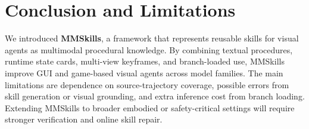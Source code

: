 
\section{Conclusion and Limitations}
\label{sec:conclusion}

We introduced \textbf{MMSkills}, a framework that represents reusable skills for visual agents as multimodal procedural knowledge. By combining textual procedures, runtime state cards, multi-view keyframes, and branch-loaded use, MMSkills improve GUI and game-based visual agents across model families. The main limitations are dependence on source-trajectory coverage, possible errors from skill generation or visual grounding, and extra inference cost from branch loading. Extending MMSkills to broader embodied or safety-critical settings will require stronger verification and online skill repair.

